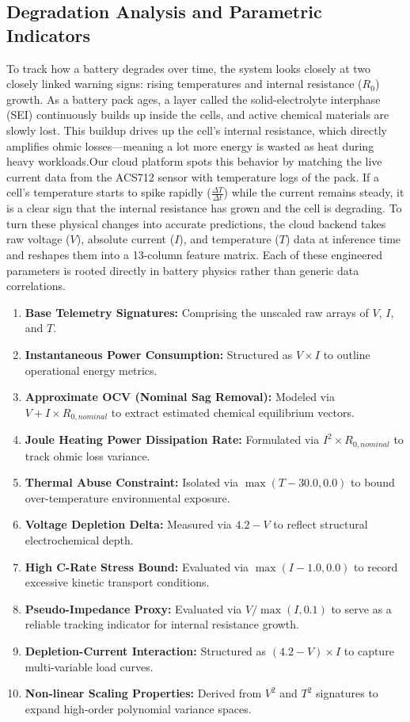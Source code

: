 \documentclass[conference]{IEEEtran}
\begin{document}
\subsection{Degradation Analysis and Parametric Indicators}
To track how a battery degrades over time, the system looks closely at two closely linked warning signs: rising temperatures and internal resistance ($R_0$) growth. As a battery pack ages, a layer called the solid-electrolyte interphase (SEI) continuously builds up inside the cells, and active chemical materials are slowly lost. This buildup drives up the cell's internal resistance, which directly amplifies ohmic losses—meaning a lot more energy is wasted as heat during heavy workloads.Our cloud platform spots this behavior by matching the live current data from the ACS712 sensor with temperature logs of the pack. If a cell's temperature starts to spike rapidly ($\frac{\Delta T}{\Delta t}$) while the current remains steady, it is a clear sign that the internal resistance has grown and the cell is degrading. To turn these physical changes into accurate predictions, the cloud backend takes raw voltage ($V$), absolute current ($I$), and temperature ($T$) data at inference time and reshapes them into a 13-column feature matrix. Each of these engineered parameters is rooted directly in battery physics rather than generic data correlations.
\begin{enumerate}
    \item \textbf{Base Telemetry Signatures:} Comprising the unscaled raw arrays of $V$, $I$, and $T$.
    \item \textbf{Instantaneous Power Consumption:} Structured as $V \times I$ to outline operational energy metrics.
    \item \textbf{Approximate OCV (Nominal Sag Removal):} Modeled via $V + I \times R_{0,nominal}$ to extract estimated chemical equilibrium vectors.
    \item \textbf{Joule Heating Power Dissipation Rate:} Formulated via $I^2 \times R_{0,nominal}$ to track ohmic loss variance.
    \item \textbf{Thermal Abuse Constraint:} Isolated via $\max(T - 30.0, 0.0)$ to bound over-temperature environmental exposure.
    \item \textbf{Voltage Depletion Delta:} Measured via $4.2 - V$ to reflect structural electrochemical depth.
    \item \textbf{High C-Rate Stress Bound:} Evaluated via $\max(I - 1.0, 0.0)$ to record excessive kinetic transport conditions.
    \item \textbf{Pseudo-Impedance Proxy:} Evaluated via $V / \max(I, 0.1)$ to serve as a reliable tracking indicator for internal resistance growth.
    \item \textbf{Depletion-Current Interaction:} Structured as $(4.2 - V) \times I$ to capture multi-variable load curves.
    \item \textbf{Non-linear Scaling Properties:} Derived from $V^2$ and $T^2$ signatures to expand high-order polynomial variance spaces.
\end{enumerate}
\end{document}
